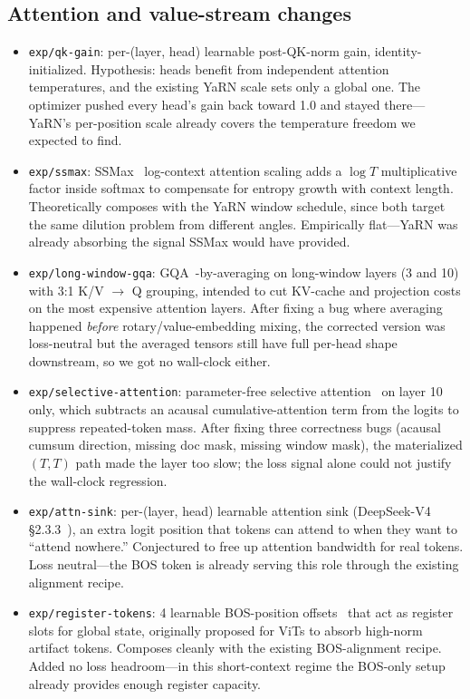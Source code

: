 \documentclass[10pt,letterpaper]{article}
\newcommand{\code}[1]{\texttt{\small #1}}
\begin{document}
\subsection{Attention and value-stream changes}
\begin{itemize}[leftmargin=1.2em,itemsep=4pt]
  \item \code{exp/qk-gain}: per-(layer, head) learnable post-QK-norm gain, identity-initialized. Hypothesis: heads benefit from independent attention temperatures, and the existing YaRN scale sets only a global one. The optimizer pushed every head's gain back toward 1.0 and stayed there---YaRN's per-position scale already covers the temperature freedom we expected to find.
  \item \code{exp/ssmax}: SSMax~\cite{ssmax} log-context attention scaling adds a $\log T$ multiplicative factor inside softmax to compensate for entropy growth with context length. Theoretically composes with the YaRN window schedule, since both target the same dilution problem from different angles. Empirically flat---YaRN was already absorbing the signal SSMax would have provided.
  \item \code{exp/long-window-gqa}: GQA~\cite{gqa}-by-averaging on long-window layers (3 and 10) with 3:1 K/V $\to$ Q grouping, intended to cut KV-cache and projection costs on the most expensive attention layers. After fixing a bug where averaging happened \emph{before} rotary/value-embedding mixing, the corrected version was loss-neutral but the averaged tensors still have full per-head shape downstream, so we got no wall-clock either.
  \item \code{exp/selective-attention}: parameter-free selective attention~\cite{selective_attn} on layer 10 only, which subtracts an acausal cumulative-attention term from the logits to suppress repeated-token mass. After fixing three correctness bugs (acausal cumsum direction, missing doc mask, missing window mask), the materialized $(T,T)$ path made the layer too slow; the loss signal alone could not justify the wall-clock regression.
  \item \code{exp/attn-sink}: per-(layer, head) learnable attention sink (DeepSeek-V4 \S2.3.3~\cite{deepseek_v4}), an extra logit position that tokens can attend to when they want to ``attend nowhere.'' Conjectured to free up attention bandwidth for real tokens. Loss neutral---the BOS token is already serving this role through the existing alignment recipe.
  \item \code{exp/register-tokens}: 4 learnable BOS-position offsets~\cite{registers} that act as register slots for global state, originally proposed for ViTs to absorb high-norm artifact tokens. Composes cleanly with the existing BOS-alignment recipe. Added no loss headroom---in this short-context regime the BOS-only setup already provides enough register capacity.

\end{itemize}
\end{document}
